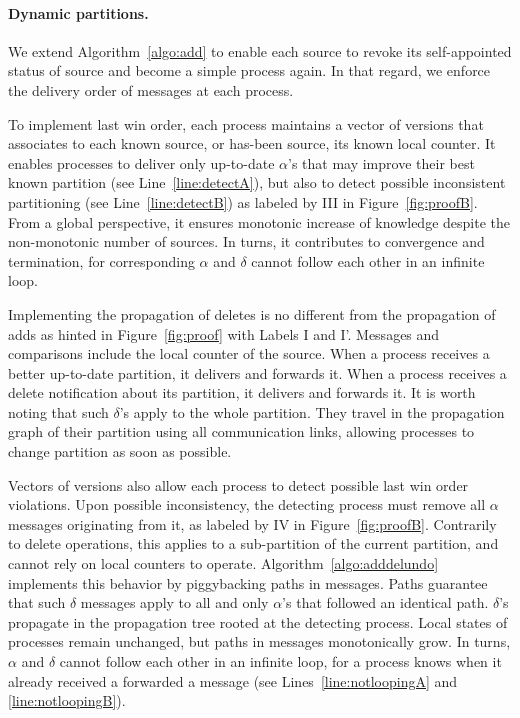 \paragraph{Dynamic partitions.}
We extend Algorithm~\ref{algo:add} to enable each source to revoke its
self-appointed status of source and become a simple process again. In
that regard, we enforce the delivery order of messages at each
process.

To implement last win order, each process maintains a vector of
versions that associates to each known source, or has-been source, its
known local counter. It enables processes to deliver only up-to-date
$\alpha$'s that may improve their best known partition (see
Line~\ref{line:detectA}), but also to detect possible inconsistent
partitioning (see Line~\ref{line:detectB}) as labeled by III in
Figure~\ref{fig:proofB}. From a global perspective, it ensures
monotonic increase of knowledge despite the non-monotonic number of
sources. In turns, it contributes to convergence and termination, for
corresponding $\alpha$ and $\delta$ cannot follow each other in an
infinite loop.

Implementing the propagation of deletes is no different from the
propagation of adds as hinted in Figure~\ref{fig:proof} with Labels I
and I'. Messages and comparisons include the local counter of the
source. When a process receives a better up-to-date partition, it
delivers and forwards it. When a process receives a delete
notification about its partition, it delivers and forwards it. It is
worth noting that such $\delta$'s apply to the whole partition. They
travel in the propagation graph of their partition using all
communication links, allowing processes to change partition as soon as
possible.

Vectors of versions also allow each process to detect possible last
win order violations. Upon possible inconsistency, the detecting
process must remove all $\alpha$ messages originating from it, as
labeled by IV in Figure~\ref{fig:proofB}. Contrarily to delete
operations, this applies to a sub-partition of the current partition,
and cannot rely on local counters to
operate. Algorithm~\ref{algo:adddelundo} implements this behavior by
piggybacking paths in messages. Paths guarantee that such $\delta$
messages apply to all and only $\alpha$'s that followed an identical
path. $\delta$'s propagate in the propagation tree rooted at the
detecting process. Local states of processes remain unchanged, but
paths in messages monotonically grow. In turns, $\alpha$ and $\delta$
cannot follow each other in an infinite loop, for a process knows when
it already received a forwarded a message (see
Lines~\ref{line:notloopingA} and \ref{line:notloopingB}).

